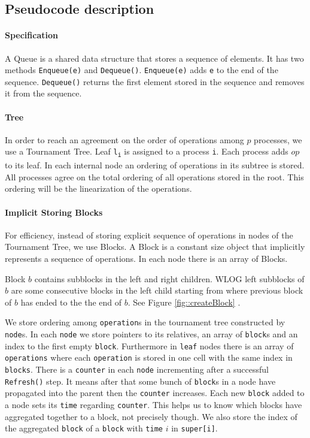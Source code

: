 \documentclass[10pt]{article}
\theoremstyle{definition}
\begin{document}
\subsection{Pseudocode description}

\paragraph{Specification}
A Queue is a shared data structure that stores a sequence of elements. It has two methods \texttt{Enqueue(e)} and \texttt{Dequeue()}. \texttt{Enqueue(e)} adds \texttt{e} to the end of the sequence. \texttt{Dequeue()} returns the first element stored in the sequence and removes it from the sequence.

\paragraph{Tree}
In order to reach an agreement on the order of operations among $p$ processes, we use a Tournament Tree. Leaf \texttt{l\textsubscript{i}} is assigned to a process \texttt{i}. Each process adds $op$ to its leaf. In each internal node an ordering of operations in its subtree is stored. All processes agree on the total ordering of all operations stored in the root. This ordering will be the linearization of the operations.
\paragraph{Implicit Storing Blocks}
For efficiency, instead of storing explicit sequence of operations in nodes of the Tournament Tree, we use Blocks. A Block is a constant size object that implicitly represents a sequence of operations. In each node there is an array of Blocks.

Block $b$ contains subblocks in the left and right children. WLOG left subblocks of $b$ are some consecutive blocks in the left child starting from where previous block of $b$ has ended to the the end of $b$. See Figure \ref{fig::createBlock} .

We store ordering among \texttt{operation}s in the tournament tree constructed by \texttt{node}s. In each \texttt{node} we store pointers to its relatives, an array of \texttt{block}s and an index to the first empty \texttt{block}. Furthermore in \texttt{leaf} nodes there is an array of \texttt{operations} where each \texttt{operation} is stored in one cell with the same index in \texttt{blocks}. There is a \texttt{counter} in each \texttt{node} incrementing after a successful \texttt{Refresh()} step. It means after that some bunch of \texttt{block}s in a node have propagated into the parent then the \texttt{counter} increases. Each new \texttt{block} added to a node sets its \texttt{time} regarding \texttt{counter}. This helps us to know which blocks have aggregated together to a block, not precisely though. We also store the index of the aggregated \texttt{block} of a \texttt{block} with \texttt{time} $i$ in \texttt{super[i]}. 
\end{document}
